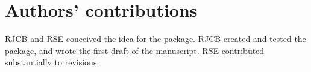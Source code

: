 \documentclass{article}
\begin{document}
\section{Authors' contributions}

RJCB and RSE conceived the idea for the package. RJCB created and tested the package, and wrote the first draft of the manuscript. RSE contributed substantially to revisions.



\end{document}
